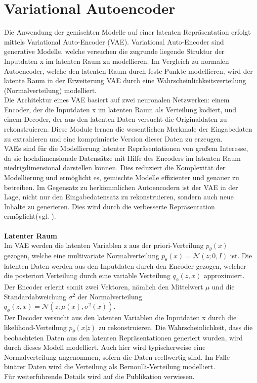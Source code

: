\documentclass[%
thesis=student,%
coverpage=false,%
titlepage=false,%
headmarks=true, %
german,%
font=libertine, %
math=newpxtx, %
BCOR=5mm,%
coverBCOR=11mm%
]{tumbook}
\theoremstyle{break}
\begin{document}
\section{Variational Autoencoder}
Die Anwendung der gemischten Modelle auf einer latenten Repräsentation erfolgt mittels Variational Auto-Encoder (VAE). Variational Auto-Encoder sind generative Modelle, welche versuchen die zugrunde liegende Struktur der Inputdaten x im latenten Raum zu modellieren. Im Vergleich zu normalen Autoencoder, welche den latenten Raum durch feste Punkte modellieren, wird der latente Raum in der Erweiterung VAE durch eine Wahrscheinlichkeitsverteilung (Normalverteilung) modelliert.\\
Die Architektur eines VAE basiert auf zwei neuronalen Netzwerken: einem Encoder, der die Inputdaten x im latenten Raum als Verteilung kodiert, und einem Decoder, der aus den latenten Daten versucht die Originaldaten zu rekonstruieren. Diese Module lernen die wesentlichen Merkmale der Eingabedaten zu extrahieren und eine komprimierte Version dieser Daten zu erzeugen.\\
VAEs sind für die Modellierung latenter Repräsentationen von großem Interesse, da sie hochdimensionale Datensätze mit Hilfe des Encoders im latenten Raum niedrigdimensional darstellen können. Dies reduziert die Komplexität der Modellierung und ermöglicht es, gemischte Modelle effizienter und genauer zu betreiben. Im Gegensatz zu herkömmlichen Autoencodern ist der VAE in der Lage, nicht nur den Eingabedatensatz zu rekonstruieren, sondern auch neue Inhalte zu generieren. Dies wird durch die verbesserte Repräsentation ermöglicht(vgl. \cite{bigdata-insider-vae}).\\
\\
\textbf{Latenter Raum}\\
Im VAE werden die latenten Variablen z aus der priori-Verteilung $p_\theta(x)$ gezogen, welche eine multivariate Normalverteilung $p_\theta(x) = \mathcal{N}(z;0,I) $ ist. Die latenten Daten werden aus den Inputdaten durch den Encoder  gezogen, welcher die posteriori Verteilung durch eine variable Verteilung $q_\phi(z,x)$ approximiert. Der Encoder erlernt somit zwei Vektoren, nämlich den Mittelwert \( \mu \) und die Standardabweichung \( \sigma^2 \) der Normalverteilung $q_\phi(z,x) = \mathcal{N}(z;\mu(x),\sigma^2(x))$.\\
Der Decoder versucht aus den latenten Variablen die Inputdaten x durch die likelihood-Verteilung $p_\theta(x|z)$  zu rekonstruieren. Die  Wahrscheinlichkeit, dass die beobachteten Daten aus den latenten Repräsentationen generiert wurden, wird durch dieses Modell modelliert. Auch hier wird typischerweise eine Normalverteilung angenommen, sofern die  Daten reellwertig sind. Im Falle binärer Daten wird die Verteilung als Bernoulli-Verteilung modelliert. \\ Für weiterführende Details wird auf die Publikation \cite{Auto-EncodingVariationalBayes} verwiesen.\\
\end{document}
